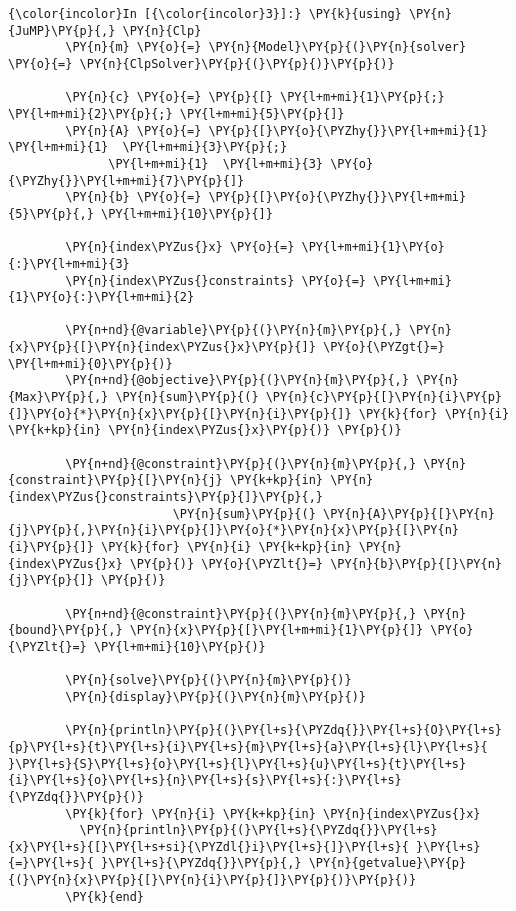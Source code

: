     \begin{Verbatim}[commandchars=\\\{\}]
{\color{incolor}In [{\color{incolor}3}]:} \PY{k}{using} \PY{n}{JuMP}\PY{p}{,} \PY{n}{Clp}
        \PY{n}{m} \PY{o}{=} \PY{n}{Model}\PY{p}{(}\PY{n}{solver} \PY{o}{=} \PY{n}{ClpSolver}\PY{p}{(}\PY{p}{)}\PY{p}{)}
        
        \PY{n}{c} \PY{o}{=} \PY{p}{[} \PY{l+m+mi}{1}\PY{p}{;} \PY{l+m+mi}{2}\PY{p}{;} \PY{l+m+mi}{5}\PY{p}{]}
        \PY{n}{A} \PY{o}{=} \PY{p}{[}\PY{o}{\PYZhy{}}\PY{l+m+mi}{1}  \PY{l+m+mi}{1}  \PY{l+m+mi}{3}\PY{p}{;}
              \PY{l+m+mi}{1}  \PY{l+m+mi}{3} \PY{o}{\PYZhy{}}\PY{l+m+mi}{7}\PY{p}{]}
        \PY{n}{b} \PY{o}{=} \PY{p}{[}\PY{o}{\PYZhy{}}\PY{l+m+mi}{5}\PY{p}{,} \PY{l+m+mi}{10}\PY{p}{]}
        
        \PY{n}{index\PYZus{}x} \PY{o}{=} \PY{l+m+mi}{1}\PY{o}{:}\PY{l+m+mi}{3}
        \PY{n}{index\PYZus{}constraints} \PY{o}{=} \PY{l+m+mi}{1}\PY{o}{:}\PY{l+m+mi}{2}
        
        \PY{n+nd}{@variable}\PY{p}{(}\PY{n}{m}\PY{p}{,} \PY{n}{x}\PY{p}{[}\PY{n}{index\PYZus{}x}\PY{p}{]} \PY{o}{\PYZgt{}=} \PY{l+m+mi}{0}\PY{p}{)}
        \PY{n+nd}{@objective}\PY{p}{(}\PY{n}{m}\PY{p}{,} \PY{n}{Max}\PY{p}{,} \PY{n}{sum}\PY{p}{(} \PY{n}{c}\PY{p}{[}\PY{n}{i}\PY{p}{]}\PY{o}{*}\PY{n}{x}\PY{p}{[}\PY{n}{i}\PY{p}{]} \PY{k}{for} \PY{n}{i} \PY{k+kp}{in} \PY{n}{index\PYZus{}x}\PY{p}{)} \PY{p}{)}
        
        \PY{n+nd}{@constraint}\PY{p}{(}\PY{n}{m}\PY{p}{,} \PY{n}{constraint}\PY{p}{[}\PY{n}{j} \PY{k+kp}{in} \PY{n}{index\PYZus{}constraints}\PY{p}{]}\PY{p}{,}
                       \PY{n}{sum}\PY{p}{(} \PY{n}{A}\PY{p}{[}\PY{n}{j}\PY{p}{,}\PY{n}{i}\PY{p}{]}\PY{o}{*}\PY{n}{x}\PY{p}{[}\PY{n}{i}\PY{p}{]} \PY{k}{for} \PY{n}{i} \PY{k+kp}{in} \PY{n}{index\PYZus{}x} \PY{p}{)} \PY{o}{\PYZlt{}=} \PY{n}{b}\PY{p}{[}\PY{n}{j}\PY{p}{]} \PY{p}{)}
        
        \PY{n+nd}{@constraint}\PY{p}{(}\PY{n}{m}\PY{p}{,} \PY{n}{bound}\PY{p}{,} \PY{n}{x}\PY{p}{[}\PY{l+m+mi}{1}\PY{p}{]} \PY{o}{\PYZlt{}=} \PY{l+m+mi}{10}\PY{p}{)}
        
        \PY{n}{solve}\PY{p}{(}\PY{n}{m}\PY{p}{)}
        \PY{n}{display}\PY{p}{(}\PY{n}{m}\PY{p}{)}
        
        \PY{n}{println}\PY{p}{(}\PY{l+s}{\PYZdq{}}\PY{l+s}{O}\PY{l+s}{p}\PY{l+s}{t}\PY{l+s}{i}\PY{l+s}{m}\PY{l+s}{a}\PY{l+s}{l}\PY{l+s}{ }\PY{l+s}{S}\PY{l+s}{o}\PY{l+s}{l}\PY{l+s}{u}\PY{l+s}{t}\PY{l+s}{i}\PY{l+s}{o}\PY{l+s}{n}\PY{l+s}{s}\PY{l+s}{:}\PY{l+s}{\PYZdq{}}\PY{p}{)}
        \PY{k}{for} \PY{n}{i} \PY{k+kp}{in} \PY{n}{index\PYZus{}x}
          \PY{n}{println}\PY{p}{(}\PY{l+s}{\PYZdq{}}\PY{l+s}{x}\PY{l+s}{[}\PY{l+s+si}{\PYZdl{}i}\PY{l+s}{]}\PY{l+s}{ }\PY{l+s}{=}\PY{l+s}{ }\PY{l+s}{\PYZdq{}}\PY{p}{,} \PY{n}{getvalue}\PY{p}{(}\PY{n}{x}\PY{p}{[}\PY{n}{i}\PY{p}{]}\PY{p}{)}\PY{p}{)}
        \PY{k}{end}
        

\end{Verbatim}
